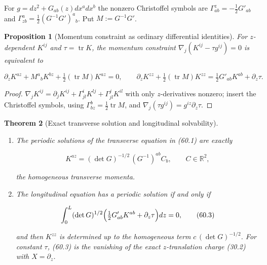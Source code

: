 \documentclass[11pt]{article}
\newtheorem{theorem}{Theorem}[section]
\newtheorem{proposition}[theorem]{Proposition}
\theoremstyle{remark}
\begin{document}
For \(g=dz^2+G_{ab}(z)dx^adx^b\) the nonzero Christoffel symbols are
\(\Gamma^z_{ab}=-\tfrac12G'_{ab}\) and
\(\Gamma^a_{zb}=\tfrac12(G^{-1}G')^a{}_b\).  Put \(M:=G^{-1}G'\).

\begin{proposition}[Momentum constraint as ordinary differential identities]
\label{prop:v19v57-ode}
For \(z\)-dependent \(K^{ij}\) and \(\tau=\operatorname{tr}K\), the
momentum constraint \(\nabla_j(K^{ij}-\tau g^{ij})=0\) is equivalent to

\[
 \partial_zK^{az}+M^a{}_bK^{bz}+\tfrac12(\operatorname{tr}M)K^{az}=0,
 \qquad
 \partial_zK^{zz}+\tfrac12(\operatorname{tr}M)K^{zz}
 =\tfrac12G'_{ab}K^{ab}+\partial_z\tau.                                \tag{60.1}
\]
\end{proposition}

\begin{proof}
\(\nabla_jK^{ij}=\partial_jK^{ij}+\Gamma^i_{jl}K^{lj}+\Gamma^j_{jl}K^{il}\)
with only \(z\)-derivatives nonzero; insert the Christoffel symbols,
using \(\Gamma^b_{bz}=\tfrac12\operatorname{tr}M\), and
\(\nabla_j(\tau g^{ij})=g^{iz}\partial_z\tau\).
\end{proof}

\begin{theorem}[Exact transverse solution and longitudinal solvability]
\label{thm:v19v57-solution}
\begin{enumerate}
\item The periodic solutions of the transverse equation in (60.1) are
      exactly

\[
 K^{az}=(\det G)^{-1/2}\,(G^{-1})^{ab}C_b,\qquad C\in\mathbb R^2,      \tag{60.2}
\]

      the homogeneous transverse momenta.
\item The longitudinal equation has a periodic solution if and only if

\[
 \int_0^L(\det G)^{1/2}\Bigl(\tfrac12G'_{ab}K^{ab}+\partial_z\tau\Bigr)dz=0,
                                                                    \tag{60.3}
\]

      and then \(K^{zz}\) is determined up to the homogeneous term
      \(c\,(\det G)^{-1/2}\).  For constant \(\tau\), (60.3) is the
      vanishing of the exact \(z\)-translation charge (30.2) with
      \(X=\partial_z\).
\end{enumerate}
\end{theorem}
\end{document}

